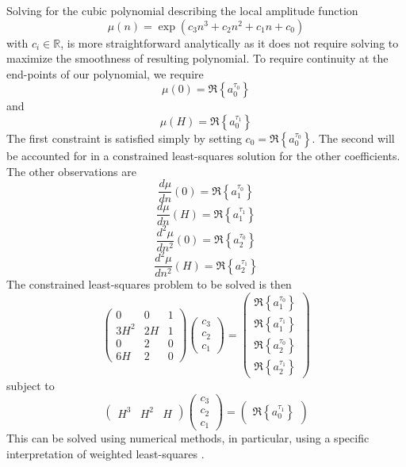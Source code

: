 Solving for the cubic polynomial describing the local amplitude function
\begin{equation}
    \mu(n) = \exp \left(c_3 n^{3} + c_2 n^{2} + c_1 n + c_0 \right)
\end{equation}
with $c_i \in \mathbb{R}$, is more straightforward analytically as it does not
require solving to maximize the smoothness of resulting polynomial. To require
continuity at the end-points of our polynomial, we require
\[
    \mu(0) = \Re \left\{ a^{\tau_0}_0 \right\}
\]
and
\[
    \mu(H) = \Re \left\{ a^{\tau_1}_0 \right\}
\]
The first constraint is satisfied simply by setting $c_0 = \Re \left\{
a^{\tau_0}_0 \right\}$. The second will be accounted for in a constrained
least-squares solution for the other coefficients. The other observations are
\[
    \frac{d \mu}{dn} (0) = \Re \left\{ a^{\tau_0}_1 \right\}
\]
\[
    \frac{d \mu}{dn} (H) = \Re \left\{ a^{\tau_1}_1 \right\}
\]
\[
    \frac{d^2 \mu}{dn^2} (0) = \Re \left\{ a^{\tau_0}_2 \right\}
\]
\[
    \frac{d^2 \mu}{dn^2} (H) = \Re \left\{ a^{\tau_1}_2 \right\}
\]
The constrained least-squares problem to be solved is then
\begin{equation}
    \begin{pmatrix}
        0 & 0 & 1 \\
        3 H^2 & 2 H & 1 \\
        0 & 2 & 0 \\
        6 H & 2 & 0
    \end{pmatrix}
    \begin{pmatrix}
        c_3 \\
        c_2 \\
        c_1
    \end{pmatrix}
    =
    \begin{pmatrix}
        \Re \left\{ a^{\tau_0}_1 \right\} \\
        \Re \left\{ a^{\tau_1}_1 \right\} \\
        \Re \left\{ a^{\tau_0}_2 \right\} \\
        \Re \left\{ a^{\tau_1}_2 \right\}
    \end{pmatrix}
\end{equation}
subject to
\[
    \begin{pmatrix}
        H^3 & H^2 & H
    \end{pmatrix}
    \begin{pmatrix}
        c_3 \\
        c_2 \\
        c_1
    \end{pmatrix}
    =
    \begin{pmatrix}
        \Re \left\{ a^{\tau_1}_0 \right\}
    \end{pmatrix}
\]
This can be solved using numerical methods, in particular, using a specific
interpretation of weighted least-squares \cite[p.~266]{golub1996matrix}.

